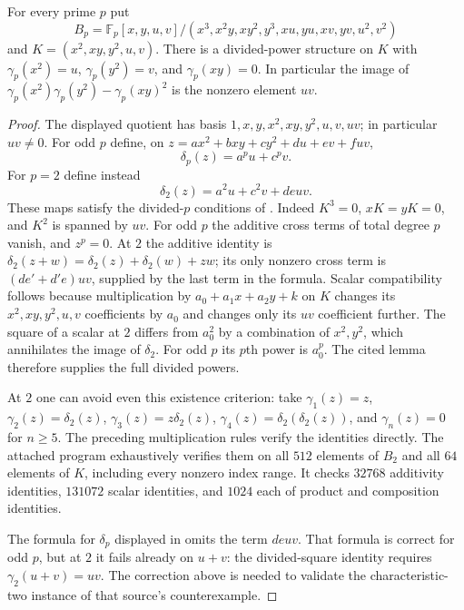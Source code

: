 \begin{lemma}
\label{B:finite-PD}
For every prime $p$ put
\[
 B_p=\mathbb F_p[x,y,u,v]/
 (x^3,x^2y,xy^2,y^3,xu,yu,xv,yv,u^2,v^2)
\]
and $K=(x^2,xy,y^2,u,v)$. There is a divided-power structure on $K$
with $\gamma_p(x^2)=u$, $\gamma_p(y^2)=v$, and
$\gamma_p(xy)=0$. In particular the image of
$\gamma_p(x^2)\gamma_p(y^2)-\gamma_p(xy)^2$ is the nonzero element $uv$.
\end{lemma}

\begin{proof}
The displayed quotient has basis
$1,x,y,x^2,xy,y^2,u,v,uv$; in particular $uv\ne0$.
For odd $p$ define, on
$z=ax^2+bxy+cy^2+du+ev+fuv$,
\[
 \delta_p(z)=a^pu+c^pv.
\]
For $p=2$ define instead
\[
 \delta_2(z)=a^2u+c^2v+deuv.
\]
These maps satisfy the divided-$p$ conditions of
\cite[Lemma 23.5.3]{B:StacksPD}. Indeed $K^3=0$, $xK=yK=0$, and
$K^2$ is spanned by $uv$. For odd $p$ the additive cross terms of
total degree $p$ vanish, and $z^p=0$. At $2$ the additive identity
is $\delta_2(z+w)=\delta_2(z)+\delta_2(w)+zw$; its only nonzero
cross term is $(de'+d'e)uv$, supplied by the last term in the
formula. Scalar compatibility follows because multiplication by
$a_0+a_1x+a_2y+k$ on $K$ changes its $x^2,xy,y^2,u,v$
coefficients by $a_0$ and changes only its $uv$ coefficient further.
The square of a scalar at $2$ differs from $a_0^2$ by a combination
of $x^2,y^2$, which annihilates the image of $\delta_2$.
For odd $p$ its $p$th power is $a_0^p$.
The cited lemma therefore supplies the full divided powers.

At $2$ one can avoid even this existence criterion: take
$\gamma_1(z)=z$, $\gamma_2(z)=\delta_2(z)$,
$\gamma_3(z)=z\delta_2(z)$, $\gamma_4(z)=\delta_2(\delta_2(z))$,
and $\gamma_n(z)=0$ for $n\geq5$. The preceding multiplication rules
verify the identities directly. The attached program exhaustively
verifies them on all $512$ elements of $B_2$ and all $64$ elements
of $K$, including every nonzero index range. It checks $32768$
additivity identities, $131072$ scalar identities, and $1024$ each
of product and composition identities.

The formula for $\delta_p$ displayed in
\cite[Example 60.22.1]{B:StacksCounterexamples} omits the term $deuv$.
That formula is correct for odd $p$, but at $2$ it fails already
on $u+v$: the divided-square identity requires
$\gamma_2(u+v)=uv$. The correction above is needed to validate
the characteristic-two instance of that source's counterexample.
\end{proof}

